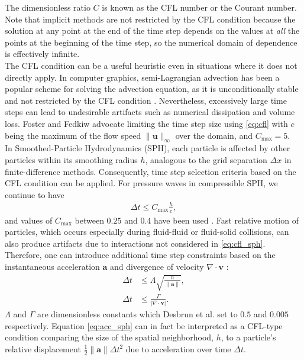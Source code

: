 The dimensionless ratio $C$ is known as the CFL number or the Courant number.
Note that implicit methods are not restricted by the CFL condition because the solution at any point at the end of the time step depends on the values at \emph{all} the points at the beginning of the time step, so the numerical domain of dependence is effectively infinite.
\\
The CFL condition can be a useful heuristic even in situations where it does not directly apply.
In computer graphics, semi-Lagrangian advection \cite{Stam1999} has been a popular scheme for solving the advection equation, as it is unconditionally stable and not restricted by the CFL condition \cite{Bridson2008}.
Nevertheless, excessively large time steps can lead to undesirable artifacts such as numerical dissipation and volume loss.
Foster and Fedkiw \cite{Foster2001} advocate limiting the time step size using \eqref{eq:cfl} with $c$ being the maximum of the flow speed $\|\mathbf u\|_\infty$ over the domain, and $C_{\max} = 5$.
\\
In Smoothed-Particle Hydrodynamics (SPH), each particle is affected by other particles within its smoothing radius $h$, analogous to the grid separation $\Delta x$ in finite-difference methods.
Consequently, time step selection criteria based on the CFL condition can be applied.
For pressure waves in compressible SPH, we continue to have
\begin{align}
  \label{eq:cfl_sph}
  \Delta t \le C_{\max}\frac hc,
\end{align}
and values of $C_{\max}$ between $0.25$ and $0.4$ have been used \cite{Monaghan1992,Desbrun1999}.
Fast relative motion of particles, which occurs especially during fluid-fluid or fluid-solid collisions, can also produce artifacts due to interactions not considered in \eqref{eq:cfl_sph}.
Therefore, one can introduce additional time step constraints based on the instantaneous acceleration $\mathbf a$ and divergence of velocity $\nabla \cdot \mathbf v$ \cite{Monaghan1992,Desbrun1999}:
\begin{align}
    \label{eq:acc_sph}
    \Delta t &\leq \Lambda \sqrt{\frac{h}{\|\mathbf a\|}}, \\
    \label{eq:div_sph}
    \Delta t &\leq \frac{\Gamma}{|\nabla \cdot \mathbf v|}.
\end{align}
$\Lambda$ and $\Gamma$ are dimensionless constants which Desbrun et al. \cite{Desbrun1999} set to $0.5$ and $0.005$ respectively.
Equation \eqref{eq:acc_sph} can in fact be interpreted as a CFL-type condition comparing the size of the spatial neighborhood, $h$, to a particle's relative displacement $\frac12\|\mathbf a\|\Delta t^2$ due to acceleration over time $\Delta t$.
